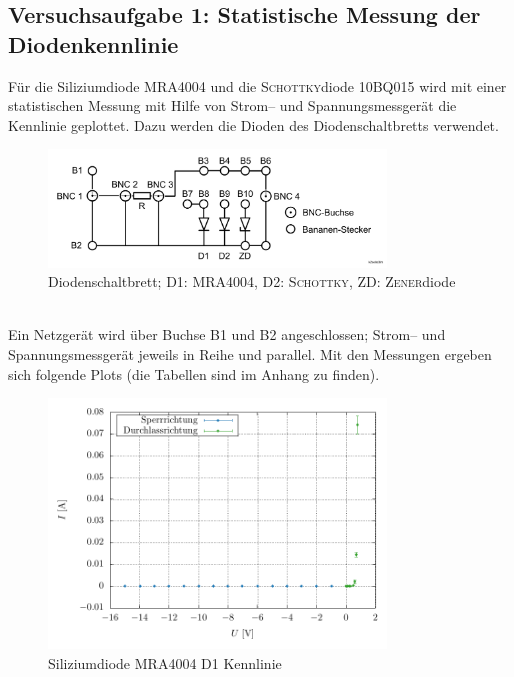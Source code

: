 \documentclass[a4paper,10pt]{article}
\numberwithin{equation}{section}
\begin{document}
\subsection{Versuchsaufgabe 1: Statistische Messung der Diodenkennlinie}
Für die Siliziumdiode MRA4004 und die \textsc{Schottky}diode 10BQ015 wird mit einer statistischen Messung mit Hilfe von Strom-- und Spannungsmessgerät die Kennlinie geplottet.
Dazu werden die Dioden des Diodenschaltbretts verwendet.
\begin{figure}[h]
        \centering
        \includegraphics[width=0.8\textwidth]{diodenschaltbrett.png}
        \caption{Diodenschaltbrett; D1: MRA4004, D2: \textsc{Schottky}, ZD: \textsc{Zener}diode}
\end{figure}\\
Ein Netzgerät wird über Buchse B1 und B2 angeschlossen; Strom-- und Spannungsmessgerät jeweils in Reihe und parallel.
Mit den Messungen ergeben sich folgende Plots (die Tabellen sind im Anhang zu finden).
\begin{figure}[h]
        \centering
        \includegraphics[width=0.8\textwidth]{plot/D1_crop.pdf}
        \caption{Siliziumdiode MRA4004 D1 Kennlinie}
\end{figure}\\
\end{document}
